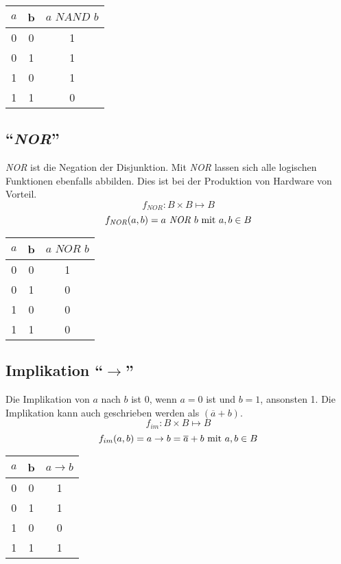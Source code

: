 \begin{center}
\begin{tabular}{ccc}
	$a$ & b & $a \textit{ NAND } b$ \\ \hline
	 0  & 0 &    1    \\
	 0  & 1 &    1    \\
	 1  & 0 &    1    \\
	 1  & 1 &    0    \\
\end{tabular}
\end{center}

\subsection{"`\textit{NOR}"'}
\textit{NOR} ist die Negation der Disjunktion. Mit \textit{NOR} lassen sich alle logischen Funktionen ebenfalls abbilden. Dies ist bei der Produktion von Hardware von Vorteil. 
$$ f_{\textit{NOR}}: B \times B \mapsto B $$
$$ f_{\textit{NOR}}(a, b) = a \textit{ NOR } b \textnormal{ mit } a, b \in B$$

\begin{center}
\begin{tabular}{ccc}
	$a$ & b & $a \textit{ NOR } b$ \\ \hline
	 0  & 0 &    1    \\
	 0  & 1 &    0    \\
	 1  & 0 &    0    \\
	 1  & 1 &    0    \\
\end{tabular}
\end{center}

\subsection{Implikation "`$\rightarrow$"'}
Die Implikation von $a$ nach $b$ ist 0, wenn $a = 0$ ist und $b = 1$, ansonsten 1. Die Implikation kann auch geschrieben werden als $(\overline{a} + b)$.
$$ f_{im}: B \times B \mapsto B $$
$$ f_{im}(a, b) = a \rightarrow b = \overline{a} + b \textnormal{ mit } a, b \in B$$

\begin{center}
\begin{tabular}{ccc}
	$a$ & b & $a \rightarrow b$ \\ \hline
	 0  & 0 &    1    \\
	 0  & 1 &    1    \\
	 1  & 0 &    0    \\
	 1  & 1 &    1    \\
\end{tabular}
\end{center}

